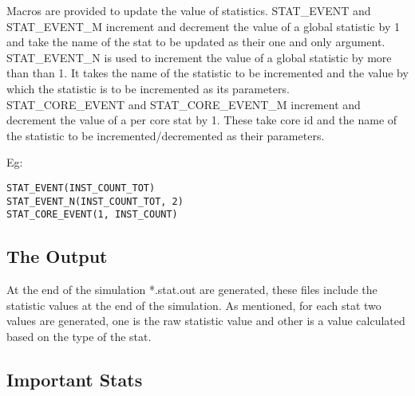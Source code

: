 \smallskip

Macros are provided to update the value of statistics. STAT\_EVENT and
STAT\_EVENT\_M increment and decrement the value of a global statistic by 1 and
take the name of the stat to be updated as their one and only argument.
STAT\_EVENT\_N is used to increment the value of a global statistic by more
than than 1. It takes the name of the statistic to be incremented and the value
by which the statistic is to be incremented as its parameters.
STAT\_CORE\_EVENT and STAT\_CORE\_EVENT\_M increment and decrement the value of
a per core stat by 1. These take core id and the name of the statistic to be
incremented/decremented as their parameters.

Eg:
\begin{lstlisting}
STAT_EVENT(INST_COUNT_TOT)
STAT_EVENT_N(INST_COUNT_TOT, 2)
STAT_CORE_EVENT(1, INST_COUNT)
\end{lstlisting}
\smallskip


\subsection{The Output}

At the end of the simulation *.stat.out are generated, these files include the
statistic values at the end of the simulation. As mentioned, for each stat two
values are generated, one is the raw statistic value and other is a value
calculated based on the type of the stat.



\subsection{Important Stats}

